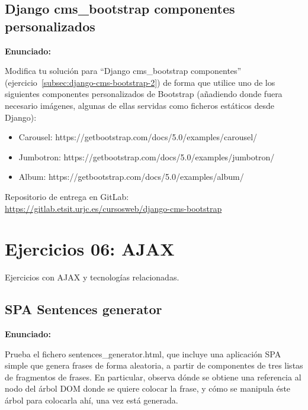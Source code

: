 \subsection{Django cms\_bootstrap componentes personalizados}
\label{subsec:django-cms-bootstrap-3}

\textbf{Enunciado:}

Modifica tu solución para ``Django cms\_bootstrap componentes'' (ejercicio~\ref{subsec:django-cms-bootstrap-2}) de forma que utilice uno de los siguientes componentes personalizados de Bootstrap (añadiendo donde fuera necesario imágenes, algunas de ellas servidas como ficheros estáticos desde Django):

\begin{itemize}
  \item Carousel: https://getbootstrap.com/docs/5.0/examples/carousel/
  \item Jumbotron: https://getbootstrap.com/docs/5.0/examples/jumbotron/
  \item Album: https://getbootstrap.com/docs/5.0/examples/album/
\end{itemize}


Repositorio de entrega en GitLab: \\
\url{https://gitlab.etsit.urjc.es/cursosweb/django-cms-bootstrap}


\section{Ejercicios 06: AJAX}

Ejercicios con AJAX y tecnologías relacionadas.

\subsection{SPA Sentences generator}
\label{subsec:spa-sentences-generator}

\textbf{Enunciado:}

Prueba el fichero sentences\_generator.html, que incluye una aplicación SPA simple que genera frases de forma aleatoria, a partir de componentes de tres listas de fragmentos de frases. En particular, observa dónde se obtiene una referencia al nodo del árbol DOM donde se quiere colocar la frase, y cómo se manipula éste árbol para colocarla ahí, una vez está generada.


